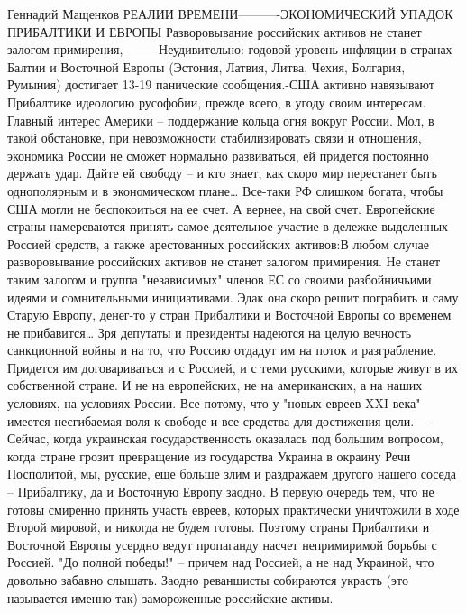 Геннадий Мащенков
РЕАЛИИ ВРЕМЕНИ----------ЭКОНОМИЧЕСКИЙ УПАДОК ПРИБАЛТИКИ И
ЕВРОПЫ Разворовывание российских активов не станет залогом
примирения, --------Неудивительно: годовой уровень
инфляции в странах Балтии и Восточной Европы (Эстония, Латвия, Литва,
Чехия, Болгария, Румыния) достигает 13-19%
панические сообщения.-США активно навязывают Прибалтике идеологию
русофобии, прежде всего, в
угоду своим интересам. Главный интерес Америки – поддержание кольца огня
вокруг России. Мол, в такой обстановке, при невозможности
стабилизировать связи и отношения, экономика России не сможет нормально
развиваться, ей придется постоянно держать удар. Дайте ей свободу – и
кто знает, как скоро мир перестанет быть однополярным и в экономическом
плане… Все-таки РФ слишком богата, чтобы США могли не беспокоиться на ее
счет. А вернее, на свой счет.
Европейские страны намереваются принять самое деятельное участие в
дележке выделенных Россией средств, а также арестованных российских
активов:В любом случае разворовывание российских активов не станет залогом
примирения. Не станет таким залогом и группа "независимых" членов ЕС со
своими разбойничьими идеями и сомнительными инициативами. Эдак она скоро
решит пограбить и саму Старую Европу, денег-то у стран Прибалтики и
Восточной Европы со временем не прибавится…
Зря депутаты и
президенты надеются на целую вечность санкционной войны и на то, что
Россию отдадут им на поток и разграбление. Придется им договариваться и с
Россией, и с теми русскими, которые живут в их собственной стране. И не
на европейских, не на американских, а на наших условиях, на условиях
России. Все потому, что у "новых евреев XXI века" имеется несгибаемая
воля к свободе и все средства для достижения цели.---Сейчас, когда украинская государственность оказалась под большим
вопросом, когда стране грозит превращение из государства Украина в
окраину Речи Посполитой, мы, русские, еще больше злим и раздражаем
другого нашего соседа – Прибалтику, да и Восточную Европу заодно. В
первую очередь тем, что не готовы смиренно принять участь евреев,
которых практически уничтожили в ходе Второй мировой, и никогда не будем
готовы. Поэтому страны Прибалтики и Восточной Европы усердно ведут
пропаганду насчет непримиримой борьбы с Россией. "До полной победы!" –
причем над Россией, а не над Украиной, что довольно забавно слышать.
Заодно реваншисты собираются украсть (это называется именно так)
замороженные российские активы.



